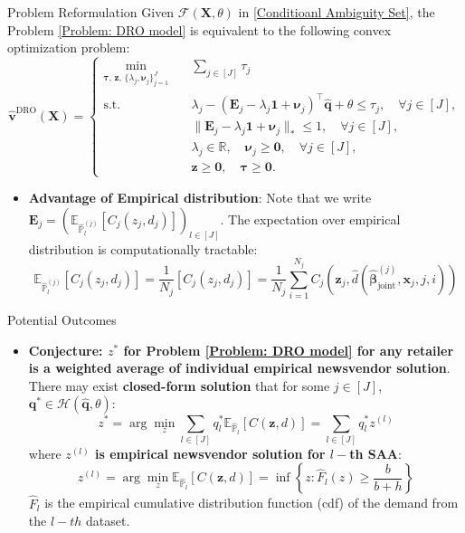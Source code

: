 \documentclass{beamer}
\newcommand{\mb}[1]{{\mathbf{#1}}}
\newcommand{\txrd}[1]{{\textcolor{sintefred}{\textbf{#1}}}}
\newcommand{\bbp}{\mathbb{P}}
\begin{document}
\begin{frame}{Problem Reformulation}
Given $\mathcal{F}(\mb X, \theta)$ in \eqref{Conditioanl Ambiguity Set},
the Problem \eqref{Problem: DRO model} is equivalent to the following convex optimization problem:
\begin{equation}
\hat{\bm v}^{\mathrm{DRO}}(\mb X)
=
\left\{
\begin{aligned}
\min_{\bm\tau,\, \bm z,\, \{\lambda_j, \bm\nu_j\}_{j=1}^J} \quad
& \sum_{j \in [J]} \tau_j \\
\text{s.t.} \quad
& \lambda_j
- (\mb E_j - \lambda_j \bm 1 + \bm\nu_j)^\top \hat{\bm q}
+ \theta
\le \tau_j,
\quad \forall j \in [J], \\
& \|\mb E_j - \lambda_j \bm 1 + \bm\nu_j\|_* \le 1,
\quad \forall j \in [J], \\
& \lambda_j \in \mathbb{R}, \quad \bm\nu_j \ge \bm 0,
\quad \forall j \in [J], \\
& \bm z \ge \bm 0, \quad \bm\tau \ge \bm 0 .
\end{aligned}
\right.
\label{Problem:SummationDRO}
\end{equation}

\begin{itemize}
    \item \txrd{Advantage of Empirical distribution}: Note that we write  $ \mb E_j =(\mathbb{E}_{\hat{\bbp}^{(j)}_l}[C_j (z_j,  d_j)])_{l\in [J]}$. The expectation over empirical distribution is computationally tractable:
    \[
    \mathbb{E}_{\hat{\bbp}^{(j)}_l}[C_j (z_j,  d_j)] = \frac{1}{N_j}[C_j (z_j,  d_j)] = \frac{1}{N_j} \sum_{i = 1}^{N_j} 
    C_j \left( \bm z_j, \hat{d}(\hat{\bm \beta}_{\text{joint}}^{(j)}, \bm x_j, j, i) \right)
    \] 
\end{itemize}

\end{frame}


\begin{frame}{Potential Outcomes}

\begin{itemize}
    \item \txrd{Conjecture: $z^*$ for Problem \eqref{Problem: DRO model} for any retailer is a weighted average of individual empirical newsvendor solution}. 
    There may exist \txrd{closed-form solution} that for some $j \in [J]$, $\bm q^* \in \mathcal{H}(\hat{\bm q}, \theta)$:
    \[
    z^* = \arg \min_z \sum_{l \in [J]} {q}_l^* \mathbb{E}_{\hat{\bbp}_l}[C (\bm z, d)] = \sum_{l \in [J]} {q}_l^* z^{(l)}
    \]
    where \txrd{$z^{(l)}$ is empirical newsvendor solution for $l-$th SAA}:
    \[
    z^{(l)} = \arg \min_z \mathbb{E}_{\hat{\bbp}_l}[C (\bm z, d)] 
     = \inf\left\{z:\hat{F}_{l}(z)\geq\frac{b}{b+h}\right\}
    \]
    $\hat{F}_{l}$ is the empirical cumulative distribution
    function (cdf) of the demand from the $l-th$ dataset.
\end{itemize}


\end{frame}
\end{document}
